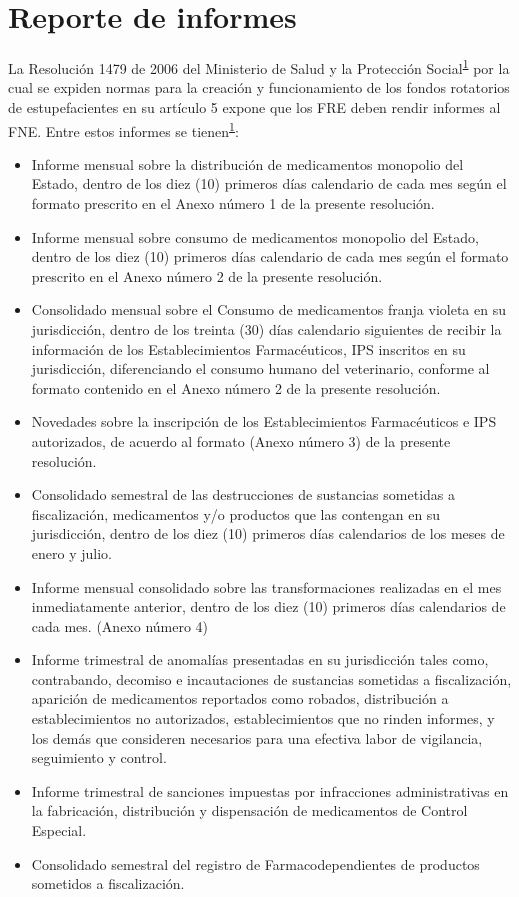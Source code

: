 \documentclass[
]{book}
\begin{document}
\hypertarget{reporte-de-informes}{%
\chapter{Reporte de informes}\label{reporte-de-informes}}


La Resolución 1479 de 2006 del Ministerio de Salud y la Protección Social\textsuperscript{\protect\hyperlink{ref-MSPS1479-2006}{1}} por la cual se expiden normas para la creación y funcionamiento de los fondos rotatorios de estupefacientes en su artículo 5 expone que los FRE deben rendir informes al FNE. Entre estos informes se tienen\textsuperscript{\protect\hyperlink{ref-MSPS1479-2006}{1}}:

\begin{itemize}
\item
  Informe mensual sobre la distribución de medicamentos monopolio del Estado, dentro de los diez (10) primeros días calendario de cada mes según el formato prescrito en el Anexo número 1 de la presente resolución.
\item
  Informe mensual sobre consumo de medicamentos monopolio del Estado, dentro de los diez (10) primeros días calendario de cada mes según el formato prescrito en el Anexo número 2 de la presente resolución.
\item
  Consolidado mensual sobre el Consumo de medicamentos franja violeta en su jurisdicción, dentro de los treinta (30) días calendario siguientes de recibir la información de los Establecimientos Farmacéuticos, IPS inscritos en su jurisdicción, diferenciando el consumo humano del veterinario, conforme al formato contenido en el Anexo número 2 de la presente resolución.
\item
  Novedades sobre la inscripción de los Establecimientos Farmacéuticos e IPS autorizados, de acuerdo al formato (Anexo número 3) de la presente resolución.
\item
  Consolidado semestral de las destrucciones de sustancias sometidas a fiscalización, medicamentos y/o productos que las contengan en su jurisdicción, dentro de los diez (10) primeros días calendarios de los meses de enero y julio.
\item
  Informe mensual consolidado sobre las transformaciones realizadas en el mes inmediatamente anterior, dentro de los diez (10) primeros días calendarios de cada mes. (Anexo número 4)
\item
  Informe trimestral de anomalías presentadas en su jurisdicción tales como, contrabando, decomiso e incautaciones de sustancias sometidas a fiscalización, aparición de medicamentos reportados como robados, distribución a establecimientos no autorizados, establecimientos que no rinden informes, y los demás que consideren necesarios para una efectiva labor de vigilancia, seguimiento y control.
\item
  Informe trimestral de sanciones impuestas por infracciones administrativas en la fabricación, distribución y dispensación de medicamentos de Control Especial.
\item
  Consolidado semestral del registro de Farmacodependientes de productos sometidos a fiscalización.
\end{itemize}
\end{document}
